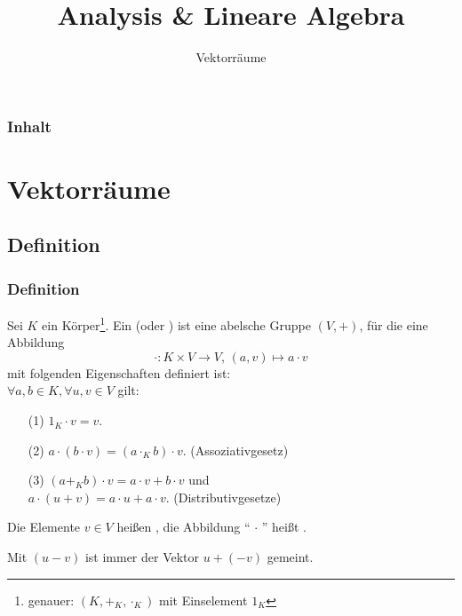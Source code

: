 

\title{Analysis \& Lineare Algebra}
\subtitle{Vektorräume}



\makeTitlePage

\begin{frame}\frametitle{Inhalt}
   \tableofcontents
\end{frame}
%

%

\section{Vektorräume}
\makeSectionDividerPage
\subsection{Definition}
%
%
\begin{frame}\frametitle{Definition}

	Sei $K$ ein Körper\footnote{genauer: $(K, +_{K}, \cdot_{K})$ mit Einselement $1_{K}$}. 
	Ein  (oder ) 
	ist eine abelsche Gruppe $(V,+)$, für die eine Abbildung
	$$
		\cdot: K\times V \to V,\,
		(a,v) \mapsto a\cdot v 
	$$ 
	mit folgenden Eigenschaften definiert ist:\\[1mm]
	
	$\forall a,b \in K, \forall u,v\in V$ gilt:
	\begin{itemize}
		\item[(1)] 
			$1_{K}\cdot v = v$.
		\item[(2)]
			$a\cdot(b\cdot v) = (a\cdot_{K} b)\cdot v$.
			(Assoziativgesetz)
		\item[(3)]
			$ (a+_{K}b)\cdot v = a\cdot v + b\cdot v$ \quad und\\
			$ a\cdot (u+v) = a\cdot u + a\cdot v.$  
			(Distributivgesetze)
	\end{itemize}
	
	\vfill 
	\pause
	Die Elemente $v\in V$ hei{\ss}en , die Abbildung `` $\cdot$ '' heißt .
	
		\vfill \pause
	Mit $(u-v)$ ist immer der Vektor $u + (-v)$ gemeint.
	
\end{frame}
%
